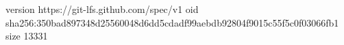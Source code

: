 version https://git-lfs.github.com/spec/v1
oid sha256:350bad897348d25560048d6dd5cdadf99aebdb92804f9015c55f5c0f03066fb1
size 13331
